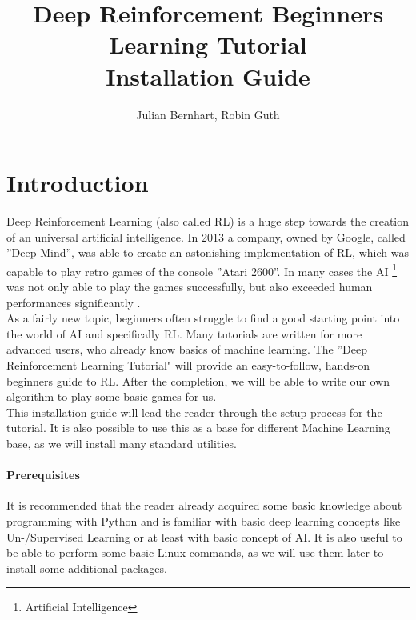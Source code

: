\documentclass[a4paper]{article}
\title{Deep Reinforcement Beginners Learning Tutorial \\Installation Guide}
\author{Julian Bernhart, Robin Guth}
\begin{document}
\maketitle
\tableofcontents

\section{Introduction}
Deep Reinforcement Learning (also called RL) is a huge step towards the creation of an universal artificial intelligence. In 2013 a company, owned by Google, called ''Deep Mind'', was able to create an astonishing implementation of RL, which was capable to play retro games of the console ''Atari 2600''. In many cases the AI \footnote{Artificial Intelligence} was not only able to play the games successfully, but also exceeded human performances significantly \cite{atari}.\\
As a fairly new topic, beginners often struggle to find a good starting point into the world of AI and specifically RL. Many tutorials are written for more advanced users, who already know basics of machine learning. The ''Deep Reinforcement Learning Tutorial" will provide an easy-to-follow, hands-on beginners guide to RL. After the completion, we will be able to write our own algorithm to play some basic games for us.\\
This installation guide will lead the reader through the setup process for the tutorial. It is also possible to use this as a base for different Machine Learning base, as we will install many standard utilities.
\paragraph{Prerequisites}
It is recommended that the reader already acquired some basic knowledge about programming with Python and is familiar with basic deep learning concepts like Un-/Supervised Learning or at least with basic concept of AI. It is also useful to be able to perform some basic Linux commands, as we will use them later to install some additional packages.
\end{document}
